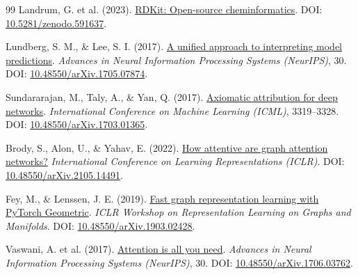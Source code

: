 \documentclass[11pt]{article}
\begin{document}
\begin{thebibliography}{99}
 Landrum, G. et al. (2023). \href{https://www.rdkit.org}{RDKit: Open-source cheminformatics}. DOI: \href{https://doi.org/10.5281/zenodo.591637}{10.5281/zenodo.591637}.

 Lundberg, S. M., \& Lee, S. I. (2017). \href{https://proceedings.neurips.cc/paper/2017/hash/8a20a8621978632d76c43dfd28b67767-Abstract.html}{A unified approach to interpreting model predictions}. \textit{Advances in Neural Information Processing Systems (NeurIPS)}, 30. DOI: \href{https://doi.org/10.48550/arXiv.1705.07874}{10.48550/arXiv.1705.07874}.

 Sundararajan, M., Taly, A., \& Yan, Q. (2017). \href{https://proceedings.mlr.press/v70/sundararajan17a.html}{Axiomatic attribution for deep networks}. \textit{International Conference on Machine Learning (ICML)}, 3319--3328. DOI: \href{https://doi.org/10.48550/arXiv.1703.01365}{10.48550/arXiv.1703.01365}.

 Brody, S., Alon, U., \& Yahav, E. (2022). \href{https://openreview.net/forum?id=F72ximsx7C1}{How attentive are graph attention networks?} \textit{International Conference on Learning Representations (ICLR)}. DOI: \href{https://doi.org/10.48550/arXiv.2105.14491}{10.48550/arXiv.2105.14491}.

 Fey, M., \& Lenssen, J. E. (2019). \href{https://arxiv.org/abs/1903.02428}{Fast graph representation learning with PyTorch Geometric}. \textit{ICLR Workshop on Representation Learning on Graphs and Manifolds}. DOI: \href{https://doi.org/10.48550/arXiv.1903.02428}{10.48550/arXiv.1903.02428}.

 Vaswani, A. et al. (2017). \href{https://proceedings.neurips.cc/paper/2017/hash/3f5ee243547dee91fbd053c1c4a845aa-Abstract.html}{Attention is all you need}. \textit{Advances in Neural Information Processing Systems (NeurIPS)}, 30. DOI: \href{https://doi.org/10.48550/arXiv.1706.03762}{10.48550/arXiv.1706.03762}.

\end{thebibliography}
\end{document}
